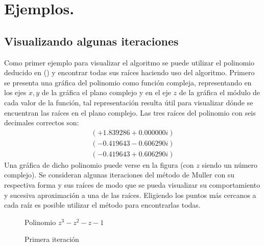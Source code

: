 \section{Ejemplos.}
\subsection{Visualizando algunas iteraciones}
Como primer ejemplo para visualizar el algoritmo se puede utilizar el polinomio deducido en
() y encontrar todas sus raíces haciendo uso del algoritmo. Primero se presenta
una gráfica del polinomio como función compleja, representando en los ejes $x,y$ de la gráfica el plano
complejo y en el eje $z$ de la gráfica el módulo de cada valor de la función, tal representación resulta útil para visualizar
dónde se encuentran las raíces en el plano complejo. Las tres raíces del polinomio con seis decimales 
correctos son: 
\begin{align*}
    \left(+1.839286+0.000000i\right)\\(-0.419643-0.606290i)\\(-0.419643+0.606290i)
\end{align*}
Una gráfica de dicho polinomio puede verse en la figura  (con $z$ siendo un número complejo).
Se consideran algunas iteraciones del método de Muller con su respectiva forma y sus raíces de modo que se pueda visualizar
su comportamiento y sucesiva aproximación a una de las raíces. Eligiendo los puntos más cercanos a cada raíz
es posible utilizar el método para encontrarlas todas.
\begin{figure}
    \centering
    \caption{Polinomio $z^3-z^2-z-1$}
    \label{zero_poly}
\end{figure} 
\begin{figure}
    \centering
    \caption{Primera iteración}
    \label{first_poly}
\end{figure}
